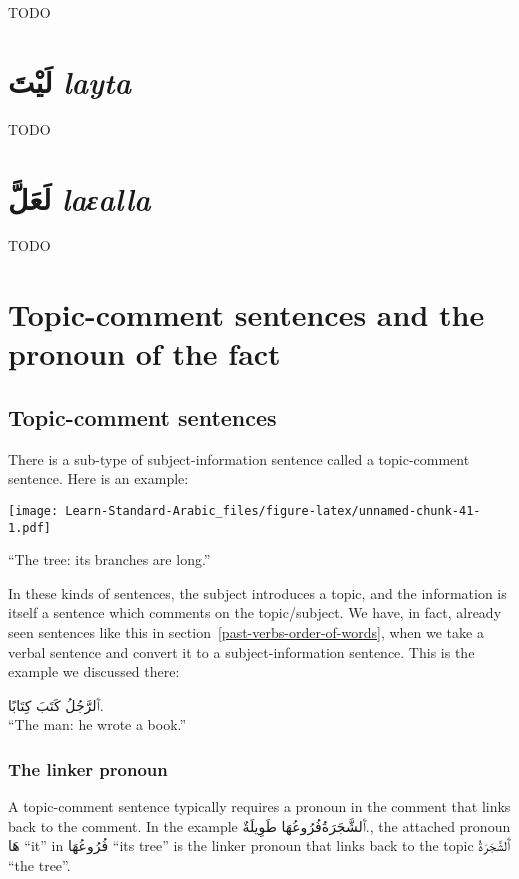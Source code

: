 \documentclass[
  10pt,
]{book}
\begin{document}
TODO

\section{\texorpdfstring{\foreignlanguage{arabic}{لَيْتَ} \emph{layta}}{لَيْتَ layta}}\label{ux644ux64aux62a-layta}

TODO

\section{\texorpdfstring{\foreignlanguage{arabic}{لَعَلَّ} \emph{laɛalla}}{لَعَلَّ laɛalla}}\label{ux644ux639ux644-laealla}

TODO

\section{Topic-comment sentences and the pronoun of the fact}\label{topic-comment-sentences-and-the-pronoun-of-the-fact}

\subsection{Topic-comment sentences}\label{topic-comment-sentences}

There is a sub-type of subject-information sentence called a topic-comment sentence. Here is an example:

\texttt{[image: Learn-Standard-Arabic\_files/figure-latex/unnamed-chunk-41-1.pdf]}

\enquote{The tree: its branches are long.}

In these kinds of sentences, the subject introduces a topic, and the information is itself a sentence which comments on the topic/subject.
We have, in fact, already seen sentences like this in section~\ref{past-verbs-order-of-words}, when we take a verbal sentence and convert it to a subject-information sentence. This is the example we discussed there:

\foreignlanguage{arabic}{ٱَلرَّجُلُ کَتَبَ کِتَابًا.}\\
\enquote{The man: he wrote a book.}

\subsubsection{The linker pronoun}\label{the-linker-pronoun}

A topic-comment sentence typically requires a pronoun in the comment that links back to the comment.
In the example
\foreignlanguage{arabic}{ٱَلشَّجَرَةُفُرُوعُهَا طَوِيلَةٌ.}, the attached pronoun \foreignlanguage{arabic}{هَا} \enquote{it} in \foreignlanguage{arabic}{فُرُوعُهَا} \enquote{its tree} is the linker pronoun that links back to the topic \foreignlanguage{arabic}{ٱَلشَّجَرَةُ} \enquote{the tree}.
\end{document}
